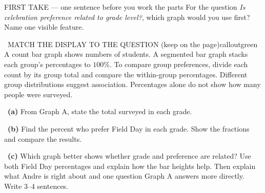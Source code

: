 \documentclass[11pt]{article}
\begin{document}
\begin{firsttakebox}{FIRST TAKE --- one sentence before you work the parts}
For the question \emph{Is celebration preference related to grade level?}, which graph would you use first? Name one visible feature.\par
{}
\end{firsttakebox}

\begin{callout}{\IconBook\ MATCH THE DISPLAY TO THE QUESTION (keep on the page)}{calloutgreen}
A count bar graph shows numbers of students. A segmented bar graph stacks each group's percentages to $100\%$. To compare group preferences, divide each count by its group total and compare the within-group percentages. Different group distributions suggest association. Percentages alone do not show how many people were surveyed.
\end{callout}

~\textbf{(a)} From Graph A, state the total surveyed in each grade.\par
{}

~\textbf{(b)} Find the percent who prefer Field Day in each grade. Show the fractions and compare the results.\par
{}

~\textbf{(c)} Which graph better shows whether grade and preference are related? Use both Field Day percentages and explain how the bar heights help. Then explain what Andre is right about and one question Graph A answers more directly. Write 3--4 sentences.\par
{}
\end{document}

